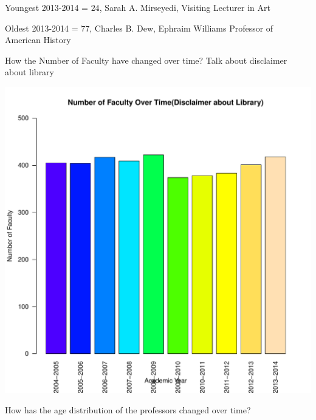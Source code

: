 \documentclass[12pt,a4paper]{article}\usepackage[]{graphicx}\usepackage[]{color}
\makeatletter
\def\maxwidth{ %
  \ifdim\Gin@nat@width>\linewidth
    \linewidth
  \else
    \Gin@nat@width
  \fi
}
\newenvironment{knitrout}{}{} %
\theoremstyle{definition}
\makeatother
\begin{document}
\bigskip
Youngest 2013-2014 = \(24\), Sarah A. Mirseyedi, Visiting Lecturer in Art

\bigskip
Oldest 2013-2014 = \(77\), Charles B. Dew, Ephraim Williams Professor of American History

\bigskip
How the Number of Faculty have changed over time? Talk about disclaimer about library



\begin{knitrout}
\color{fgcolor}
\includegraphics[width=\maxwidth]{figure/unnamed-chunk-8-1} 

\end{knitrout}

\bigskip
How has the age distribution of the professors changed over time?
\end{document}

